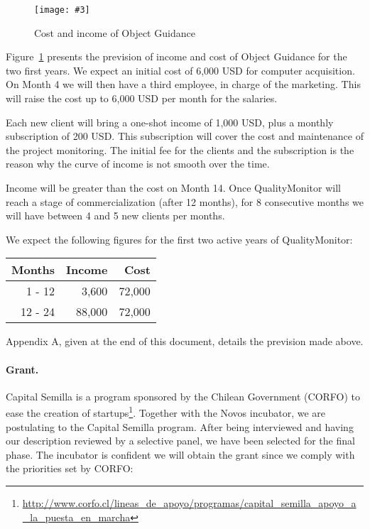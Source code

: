 \documentclass[runningheads]{llncs}
\newcommand{\fig}[4]{
	\begin{figure}[#1]
		\centering
		\texttt{[image: \#3]}
		\caption{\label{fig:#3}#4}
	\end{figure}}
\newcommand{\figref}[1]{Figure~\ref{fig:#1}}
\begin{document}
\fig{}{1}{income}{Cost and income of Object Guidance}

\figref{income} presents the prevision of income and cost of Object Guidance for the two first years. We expect an initial cost of 6,000 USD for computer acquisition. On Month 4 we will then have a third employee, in charge of the marketing. This will raise the cost up to 6,000 USD per month for the salaries. 

Each new client will bring a one-shot income of 1,000 USD, plus a monthly subscription of 200 USD. This subscription will cover the cost and maintenance of the project monitoring. The initial fee for the clients and the subscription is the reason why the curve of income is not smooth over the time.

Income will be greater than the cost on Month 14. Once QualityMonitor will reach a stage of commercialization (after 12 months), for 8 consecutive months we will have between 4 and 5 new clients per months. 

We expect the following figures for the first two active years of QualityMonitor:
\begin{center}
\begin{tabular}{|r|r|r|}
\hline
\textbf{Months} 	&	\textbf{Income}	& \textbf{Cost} \\\hline\hline
1 - 12	&	3,600	& 72,000\\\hline
12 - 24	&	88,000	& 72,000\\
\hline
\end{tabular}
\end{center}

Appendix A, given at the end of this document, details the prevision made above.

\paragraph{Grant.} Capital Semilla is a program sponsored by the Chilean Government (CORFO) to ease the creation of startups\footnote{\url{http://www.corfo.cl/lineas_de_apoyo/programas/capital_semilla_apoyo_a_la_puesta_en_marcha}}. Together with the Novos incubator, we are postulating to the Capital Semilla program. After being interviewed and having our description reviewed by a selective panel, we have been selected for the final phase. The incubator is confident we will obtain the grant since we comply with the priorities set by CORFO: 
\end{document}
